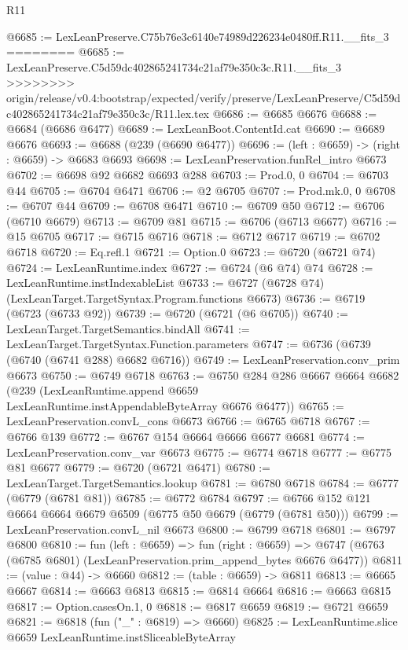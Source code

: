\begin{lexlean}{R11}
\begin{coremodule}
{{{{{{{{{{{{{{{{{{{{{{{{{{{{{{{{{{{{{{{{{{{{{{{{{{{{{{{{{{{{{{{{{{{{{{{{{{{{{{{{{{@6685 := LexLeanPreserve.C75b76e3c6140e74989d226234e0480ff.R11.__fits_3
========
@6685 := LexLeanPreserve.C5d59dc402865241734c21af79e350c3c.R11.__fits_3
>>>>>>>> origin/release/v0.4:bootstrap/expected/verify/preserve/LexLeanPreserve/C5d59dc402865241734c21af79e350c3c/R11.lex.tex
@6686 := @6685 @6676
@6688 := @6684 (@6686 @6477)
@6689 := LexLeanBoot.ContentId.cat
@6690 := @6689 @6676
@6693 := @6688 (@239 (@6690 @6477))
@6696 := (left : @6659) -> (right : @6659) -> @6683 @6693
@6698 := LexLeanPreservation.funRel_intro @6673
@6702 := @6698 @92 @6682 @6693 @288
@6703 := Prod.{0, 0}
@6704 := @6703 @44
@6705 := @6704 @6471
@6706 := @2 @6705
@6707 := Prod.mk.{0, 0}
@6708 := @6707 @44
@6709 := @6708 @6471
@6710 := @6709 @50
@6712 := @6706 (@6710 @6679)
@6713 := @6709 @81
@6715 := @6706 (@6713 @6677)
@6716 := @15 @6705
@6717 := @6715 @6716
@6718 := @6712 @6717
@6719 := @6702 @6718
@6720 := Eq.refl.{1}
@6721 := Option.{0}
@6723 := @6720 (@6721 @74)
@6724 := LexLeanRuntime.index
@6727 := @6724 (@6 @74) @74
@6728 := LexLeanRuntime.instIndexableList
@6733 := @6727 (@6728 @74) (LexLeanTarget.TargetSyntax.Program.functions @6673)
@6736 := @6719 (@6723 (@6733 @92))
@6739 := @6720 (@6721 (@6 @6705))
@6740 := LexLeanTarget.TargetSemantics.bindAll
@6741 := LexLeanTarget.TargetSyntax.Function.parameters
@6747 := @6736 (@6739 (@6740 (@6741 @288) @6682 @6716))
@6749 := LexLeanPreservation.conv_prim @6673
@6750 := @6749 @6718
@6763 := @6750
    @284
    @286
    @6667
    @6664
    @6682
    (@239 (LexLeanRuntime.append @6659 LexLeanRuntime.instAppendableByteArray @6676 @6477))
@6765 := LexLeanPreservation.convL_cons @6673
@6766 := @6765 @6718
@6767 := @6766 @139
@6772 := @6767 @154 @6664 @6666 @6677 @6681
@6774 := LexLeanPreservation.conv_var @6673
@6775 := @6774 @6718
@6777 := @6775 @81 @6677
@6779 := @6720 (@6721 @6471)
@6780 := LexLeanTarget.TargetSemantics.lookup
@6781 := @6780 @6718
@6784 := @6777 (@6779 (@6781 @81))
@6785 := @6772 @6784
@6797 := @6766 @152 @121 @6664 @6664 @6679 @6509 (@6775 @50 @6679 (@6779 (@6781 @50)))
@6799 := LexLeanPreservation.convL_nil @6673
@6800 := @6799 @6718
@6801 := @6797 @6800
@6810 := fun (left : @6659) =>
  fun (right : @6659) =>
  @6747 (@6763 (@6785 @6801) (LexLeanPreservation.prim_append_bytes @6676 @6477))
@6811 := (value : @44) -> @6660
@6812 := (table : @6659) -> @6811
@6813 := @6665 @6667
@6814 := @6663 @6813
@6815 := @6814 @6664
@6816 := @6663 @6815
@6817 := Option.casesOn.{1, 0}
@6818 := @6817 @6659
@6819 := @6721 @6659
@6821 := @6818 (fun ("_" : @6819) => @6660)
@6825 := LexLeanRuntime.slice @6659 LexLeanRuntime.instSliceableByteArray
}}}}}}}}}}}}}}}}}}}}}}}}}}}}}}}}}}}}}}}}}}}}}}}}}}}}}}}}}}}}}}}}}}}}}}}}}}}}}}}}}}
\end{coremodule}
\end{lexlean}
